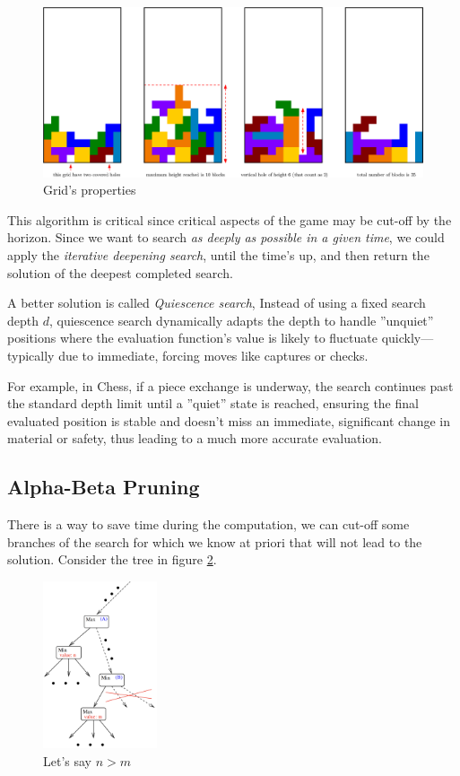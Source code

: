 \documentclass[10pt, letterpaper]{report}
\begin{document}
\begin{figure}[h!]
    \centering
    \includegraphics[width=\textwidth ]{images/grid_properties.eps}
    \caption{Grid's properties}
    \label{fig:tetris}
\end{figure}

This algorithm is critical since critical  aspects of the game may be cut-off by the horizon. Since we want to search \textit{as deeply as possible in a given time}, we could apply the \textit{iterative deepening search}, until the time's up, and then return the solution of the deepest completed search.\bigskip 

A better solution is called \textit{Quiescence search}, Instead of using a fixed search depth $d$, quiescence search dynamically adapts the depth to handle ''unquiet'' positions where the evaluation function's value is likely to fluctuate quickly—typically due to immediate, forcing moves like captures or checks.

For example, in Chess, if a piece exchange is underway, the search continues past the standard depth limit until a ''quiet'' state is reached, ensuring the final evaluated position is stable and doesn't miss an immediate, significant change in material or safety, thus leading to a much more accurate evaluation.

\subsection{Alpha-Beta Pruning}
There is a way to save time during the computation, we can cut-off some branches of the search for which we know at priori that will not lead to the solution. Consider the tree in figure \ref{fig:alphaPruning}.

\begin{figure}[h!]
    \centering
    \includegraphics[width=0.3\textwidth ]{images/alphapruning.png}
    \caption{Let's say $n>m$}
    \label{fig:alphaPruning}
\end{figure}
\end{document}
